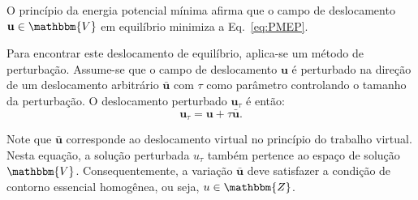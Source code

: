 O princípio da energia potencial mínima afirma que o campo de deslocamento $\mathbf{u} \in \mathbbm{V}$ em equilíbrio minimiza a Eq.~\eqref{eq:PMEP}. 

Para encontrar este deslocamento de equilíbrio, aplica-se um método de perturbação. Assume-se que o campo de deslocamento $\mathbf{u}$ é perturbado na direção de um deslocamento arbitrário $\mathbf{\bar{u}}$ com $\tau$ como parâmetro controlando o tamanho da perturbação. O deslocamento perturbado $\mathbf{u}_\tau$ é então:
\begin{equation}
	\mathbf{u}_\tau = \mathbf{u} + \tau \mathbf{\bar{u}}.
\end{equation}

Note que $\mathbf{\bar{u}}$ corresponde ao deslocamento virtual no princípio do trabalho virtual. Nesta equação, a solução perturbada $u_\tau$ também pertence ao espaço de solução $\mathbbm{V}$. Consequentemente, a variação $\mathbf{\bar{u}}$ deve satisfazer a condição de contorno essencial homogênea, ou seja, $u \in \mathbbm{Z}$.

